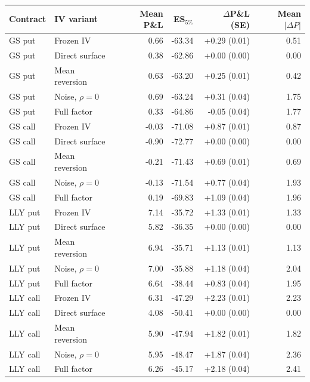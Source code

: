 \begin{tabular}{llrrrr}
\toprule
Contract & IV variant & Mean P\&L & ES$_{5\%}$ & $\Delta$P\&L (SE) & Mean $|\Delta P|$ \\
\midrule
GS put & Frozen IV & 0.66 & -63.34 & +0.29 (0.01) & 0.51 \\
GS put & Direct surface & 0.38 & -62.86 & +0.00 (0.00) & 0.00 \\
GS put & Mean reversion & 0.63 & -63.20 & +0.25 (0.01) & 0.42 \\
GS put & Noise, $\rho=0$ & 0.69 & -63.24 & +0.31 (0.04) & 1.75 \\
GS put & Full factor & 0.33 & -64.86 & -0.05 (0.04) & 1.77 \\
\midrule
GS call & Frozen IV & -0.03 & -71.08 & +0.87 (0.01) & 0.87 \\
GS call & Direct surface & -0.90 & -72.77 & +0.00 (0.00) & 0.00 \\
GS call & Mean reversion & -0.21 & -71.43 & +0.69 (0.01) & 0.69 \\
GS call & Noise, $\rho=0$ & -0.13 & -71.54 & +0.77 (0.04) & 1.93 \\
GS call & Full factor & 0.19 & -69.83 & +1.09 (0.04) & 1.96 \\
\midrule
LLY put & Frozen IV & 7.14 & -35.72 & +1.33 (0.01) & 1.33 \\
LLY put & Direct surface & 5.82 & -36.35 & +0.00 (0.00) & 0.00 \\
LLY put & Mean reversion & 6.94 & -35.71 & +1.13 (0.01) & 1.13 \\
LLY put & Noise, $\rho=0$ & 7.00 & -35.88 & +1.18 (0.04) & 2.04 \\
LLY put & Full factor & 6.64 & -38.44 & +0.83 (0.04) & 1.95 \\
\midrule
LLY call & Frozen IV & 6.31 & -47.29 & +2.23 (0.01) & 2.23 \\
LLY call & Direct surface & 4.08 & -50.41 & +0.00 (0.00) & 0.00 \\
LLY call & Mean reversion & 5.90 & -47.94 & +1.82 (0.01) & 1.82 \\
LLY call & Noise, $\rho=0$ & 5.95 & -48.47 & +1.87 (0.04) & 2.36 \\
LLY call & Full factor & 6.26 & -45.17 & +2.18 (0.04) & 2.41 \\
\midrule
\end{tabular}
